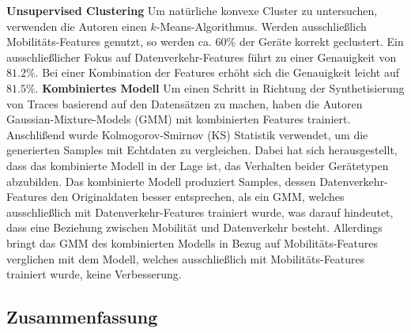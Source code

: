 \documentclass[12pt, a4paper]{article}
\begin{document}
\textbf{Unsupervised Clustering}\newline
Um natürliche konvexe Cluster zu untersuchen, verwenden die Autoren einen $k$-Means-Algorithmus.
Werden ausschließlich Mobilitäts-Features genutzt, so werden ca. $60 \%$ der Geräte korrekt geclustert.
Ein ausschließlicher Fokus auf Datenverkehr-Features führt zu einer Genauigkeit von $81.2 \%$.
Bei einer Kombination der Features erhöht sich die Genauigkeit leicht auf $81.5 \%$.
\newline\newline
\textbf{Kombiniertes Modell}\newline
Um einen Schritt in Richtung der Synthetisierung von Traces basierend auf den Datensätzen zu machen,
haben die Autoren Gaussian-Mixture-Models (GMM) mit kombinierten Features trainiert.
Anschlißend wurde Kolmogorov-Smirnov (KS) Statistik verwendet, um die generierten Samples mit Echtdaten zu vergleichen.
Dabei hat sich herausgestellt, dass das kombinierte Modell in der Lage ist, das Verhalten beider Gerätetypen abzubilden.
Das kombinierte Modell produziert Samples, dessen Datenverkehr-Features den Originaldaten besser entsprechen, als ein GMM,
welches ausschließlich mit Datenverkehr-Features trainiert wurde, was darauf hindeutet, dass eine Beziehung zwischen Mobilität
und Datenverkehr besteht. Allerdings bringt das GMM des kombinierten Modells in Bezug auf Mobilitäts-Features verglichen mit
dem Modell, welches ausschließlich mit Mobilitäts-Features trainiert wurde, keine Verbesserung.

\subsection{Zusammenfassung}
\label{sec:summary}
\end{document}
